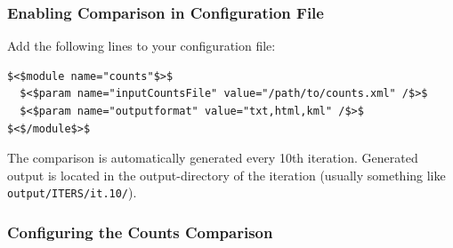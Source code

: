 \subsubsection{Enabling Comparison in Configuration File}

Add the following lines to your configuration file:
\begin{verbatim}
$<$module name="counts"$>$
  $<$param name="inputCountsFile" value="/path/to/counts.xml" /$>$
  $<$param name="outputformat" value="txt,html,kml" /$>$
$<$/module$>$

\end{verbatim}

The comparison is automatically generated every 10th iteration.  Generated output is located in the output-directory of the iteration  (usually something like
\texttt{output/ITERS/it.10/}).


\subsubsection{Configuring the Counts Comparison}

